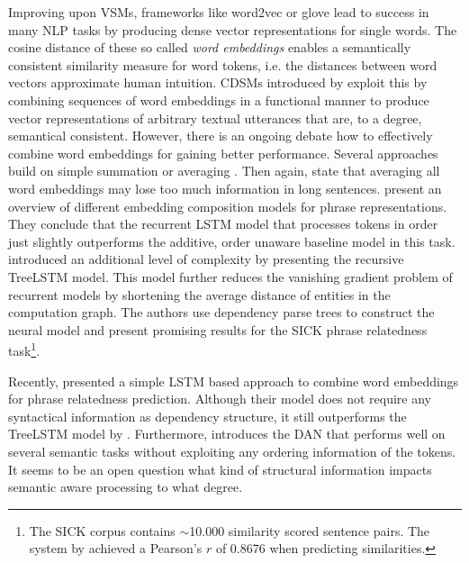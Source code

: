 Improving upon \acp{VSM}, frameworks like word2vec \autocite{mikolov_distributed_2013} or glove \autocite{pennington_glove_2014} lead to success in many \ac{NLP} tasks by producing dense vector representations for single words. The cosine distance of these so called \textit{word embeddings} enables a semantically consistent similarity measure for word tokens, i.e. the distances between word vectors approximate human intuition. \acp{CDSM} introduced by \textcite{clark_compositional_2008} exploit this by combining sequences of word embeddings in a functional manner to produce vector representations of arbitrary textual utterances that are, to a degree, semantical consistent. However, there is an ongoing debate how to effectively combine word embeddings for gaining better performance. Several approaches build on simple summation or averaging \autocite{habernal_exploiting_2015,boltuzic_identifying_2015,misra_measuring_2016}. Then again, \Textcite{misra_measuring_2016} state that averaging all word embeddings may lose too much information in long sentences. \Textcite{wang_comparison_2017} present an overview of different embedding composition models for phrase representations. They conclude that the recurrent \ac{LSTM} model \autocite{hochreiter_long_1997} that processes tokens in order just slightly outperforms the additive, order unaware baseline model in this task. \Textcite{tai_improved_2015} introduced an additional level of complexity by presenting the recursive TreeLSTM model. This model further reduces the vanishing gradient problem of recurrent models by shortening the average distance of entities in the computation graph. The authors use dependency parse trees to construct the neural model and present promising results for the SICK phrase relatedness task\footnote{The SICK corpus \autocite{marelli_sick_2014} contains $\sim$10.000 similarity scored sentence pairs. The system by \Textcite{tai_improved_2015} achieved a Pearson's $r$ of 0.8676 when predicting similarities.}. 

Recently, \Textcite{mueller_siamese_2016} presented a simple \ac{LSTM} based approach to combine word embeddings for phrase relatedness prediction. Although their model does not require any syntactical information as dependency structure, it still outperforms the TreeLSTM model by \textcite{tai_improved_2015}. Furthermore, \Textcite{iyyer_deep_2015} introduces the \ac{DAN} that performs well on several semantic tasks without exploiting any ordering information of the tokens. It seems to be an open question what kind of structural information impacts semantic aware processing to what degree.



